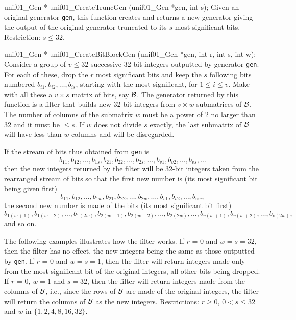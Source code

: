 unif01_Gen * unif01_CreateTruncGen (unif01_Gen *gen, int s);
\endcode
 \tab   Given an original generator {\tt gen}, this function
%
  creates and returns a new generator giving the output of the
  original generator truncated to its $s$ most significant bits.
 Restriction: $s \le 32$.
\endtab
\code


unif01_Gen * unif01_CreateBitBlockGen (unif01_Gen *gen, int r, int s,
                                       int w);
\endcode
 \tab  Consider a group of $v \le 32$ successive 32-bit integers
  outputted by generator {\tt gen}. For each of these, drop the $r$ most
%
  significant bits and keep the $s$ following bits numbered
  $b_{i 1}, b_{i 2}, \ldots, b_{i s}$, starting with the
  most significant, for $1 \le i \le v$.
  Make with all these a $v\times s$ matrix of bits, say ${\cal B}$.
  The generator returned by this function is a filter that builds new 32-bit
   integers from $v\times w$ submatrices of ${\cal B}$.
  The number of columns of the submatrix $w$ must be a power of 2 no larger
  than 32 and it must be $\le s$. If $w$ does not divide $s$ exactly,
  the last submatrix of ${\cal B}$ will have less than $w$ columns and
  will be disregarded.

  If the stream of bits thus obtained from {\tt gen} is
  $$
   b_{1 1}, b_{1 2}, \ldots,  b_{1 s},
   b_{2 1}, b_{2 2}, \ldots,  b_{2 s},
   \ldots,
   b_{v 1}, b_{v 2}, \ldots,  b_{v s}, \ldots
$$
   then the new integers returned by the filter will be 32-bit integers
   taken from the rearranged stream of bits so that the first new
   number is (its most significant bit being given first)
  $$
   b_{1 1}, b_{1 2}, \ldots,  b_{1 w},
   b_{2 1}, b_{2 2}, \ldots,  b_{2 w},
   \ldots,
   b_{v 1}, b_{v 2}, \ldots,  b_{v w},
$$
  the second new  number is made of the bits (its most
  significant bit first)
  $$
   b_{1 (w+1)}, b_{1 (w+2)}, \ldots,  b_{1 (2w)},
   b_{2 (w+1)}, b_{2 (w+2)}, \ldots,  b_{2 (2w)},
   \ldots,
   b_{v (w+1)}, b_{v (w+2)}, \ldots,  b_{v (2w)},
  $$
  and so on.

  The following examples illustrates how the filter works.
  If $r$ = 0 and $w = s = 32$, then the filter has no effect,
  the new integers being the same as those outputted by  {\tt gen}.
  If $r$ = 0 and $w = s = 1$, then the filter will return integers
  made only from the most significant bit of the original integers, all
  other bits being dropped.
  If $r$ = 0, $w = 1$ and $ s = 32$, then the filter will return integers
  made from the columns of ${\cal B}$, i.e., since the rows of ${\cal B}$
  are made of the original integers, the filter will return the columns
  of ${\cal B}$ as the new integers.
  Restrictions: $r \ge 0$, $0 < s \le 32$ and
   $w$ in  $\{1, 2, 4, 8, 16, 32\}$.
 \endtab
\code



